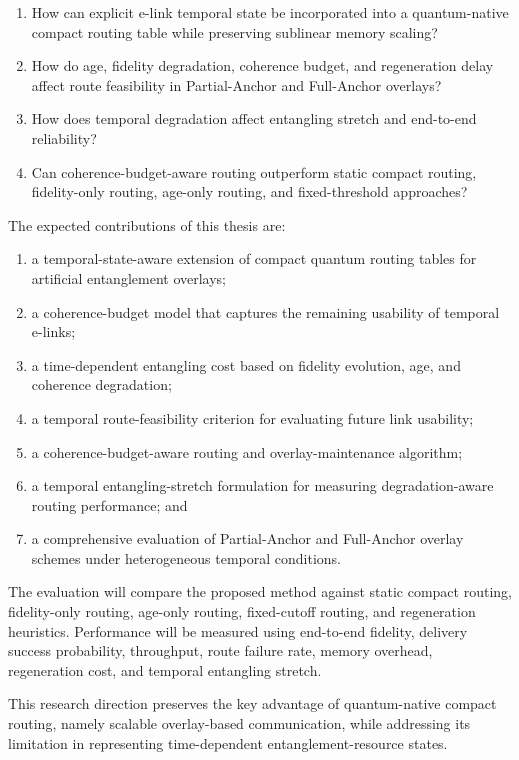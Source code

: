 \begin{enumerate}
    \item How can explicit e-link temporal state be incorporated into a quantum-native compact routing table while preserving sublinear memory scaling?

    \item How do age, fidelity degradation, coherence budget, and regeneration delay affect route feasibility in Partial-Anchor and Full-Anchor overlays?

    \item How does temporal degradation affect entangling stretch and end-to-end reliability?

    \item Can coherence-budget-aware routing outperform static compact routing, fidelity-only routing, age-only routing, and fixed-threshold approaches?
\end{enumerate}

The expected contributions of this thesis are:

\begin{enumerate}
    \item a temporal-state-aware extension of compact quantum routing tables for artificial entanglement overlays;

    \item a coherence-budget model that captures the remaining usability of temporal e-links;

    \item a time-dependent entangling cost based on fidelity evolution, age,
and coherence degradation;

    \item a temporal route-feasibility criterion for evaluating future link usability;

    \item a coherence-budget-aware routing and overlay-maintenance algorithm;

    \item a temporal entangling-stretch formulation for measuring degradation-aware routing performance; and

    \item a comprehensive evaluation of Partial-Anchor and Full-Anchor overlay schemes under heterogeneous temporal conditions.
\end{enumerate}

The evaluation will compare the proposed method against static compact routing, fidelity-only routing, age-only routing, fixed-cutoff routing, and regeneration heuristics. Performance will be measured using end-to-end fidelity, delivery success probability, throughput, route failure rate, memory overhead, regeneration cost, and temporal entangling stretch.

This research direction preserves the key advantage of quantum-native compact routing, namely scalable overlay-based communication, while addressing its limitation in representing time-dependent entanglement-resource states.